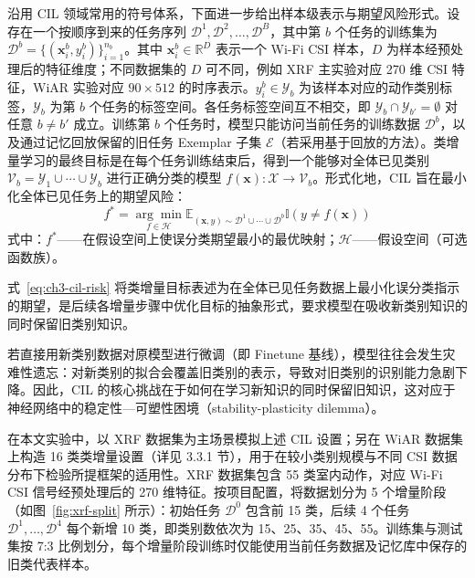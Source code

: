 沿用 CIL 领域常用的符号体系\cite{zhou2024cil}，下面进一步给出样本级表示与期望风险形式。设存在一个按顺序到来的任务序列 $\mathcal{D}^1, \mathcal{D}^2, \ldots, \mathcal{D}^B$，其中第 $b$ 个任务的训练集为 $\mathcal{D}^b = \{(\mathbf{x}_i^b, y_i^b)\}_{i=1}^{n_b}$。其中 $\mathbf{x}_i^b \in \mathbb{R}^D$ 表示一个 Wi-Fi CSI 样本，$D$ 为样本经预处理后的特征维度；不同数据集的 $D$ 可不同，例如 XRF 主实验对应 270 维 CSI 特征，WiAR 实验对应 $90 \times 512$ 的时序表示。$y_i^b \in \mathcal{Y}_b$ 为该样本对应的动作类别标签，$\mathcal{Y}_b$ 为第 $b$ 个任务的标签空间。各任务标签空间互不相交，即 $\mathcal{Y}_b \cap \mathcal{Y}_{b'} = \emptyset$ 对任意 $b \neq b'$ 成立。训练第 $b$ 个任务时，模型只能访问当前任务的训练数据 $\mathcal{D}^b$，以及通过记忆回放保留的旧任务 Exemplar 子集 $\mathcal{E}$（若采用基于回放的方法）。类增量学习的最终目标是在每个任务训练结束后，得到一个能够对全体已见类别 $\mathcal{V}_b = \mathcal{Y}_1 \cup \cdots \cup \mathcal{Y}_b$ 进行正确分类的模型 $f(\mathbf{x}) : \mathcal{X} \to \mathcal{V}_b$。形式化地，CIL 旨在最小化全体已见任务上的期望风险\cite{zhou2024cil}：
\begin{equation}\label{eq:ch3-cil-risk}
f^* = \underset{f \in \mathcal{H}}{\arg\min} \mathbb{E}_{(\mathbf{x},y) \sim \mathcal{D}^1 \cup \cdots \cup \mathcal{D}^b} \mathbb{I}(y \neq f(\mathbf{x}))
\end{equation}
\noindent 式中：$f^*$——在假设空间上使误分类期望最小的最优映射；$\mathcal{H}$——假设空间（可选函数族）。

式~\eqref{eq:ch3-cil-risk} 将类增量目标表述为在全体已见任务数据上最小化误分类指示的期望，是后续各增量步骤中优化目标的抽象形式，要求模型在吸收新类别知识的同时保留旧类别知识。

若直接用新类别数据对原模型进行微调（即 Finetune 基线），模型往往会发生灾难性遗忘：对新类别的拟合会覆盖旧类别的表示，导致对旧类别的识别能力急剧下降。因此，CIL 的核心挑战在于如何在学习新知识的同时保留旧知识，这对应于神经网络中的稳定性—可塑性困境（stability-plasticity dilemma）\cite{grossberg1982studies,zhou2024cil}。

在本文实验中，以 XRF 数据集为主场景模拟上述 CIL 设置；另在 WiAR 数据集上构造 16 类类增量设置（详见 3.3.1 节），用于在较小类别规模与不同 CSI 数据分布下检验所提框架的适用性。XRF 数据集包含 55 类室内动作，对应 Wi-Fi CSI 信号经预处理后的 270 维特征。按项目配置，将数据划分为 5 个增量阶段（如图~\ref{fig:xrf-split} 所示）：初始任务 $\mathcal{D}^0$ 包含前 15 类，后续 4 个任务 $\mathcal{D}^1, \ldots, \mathcal{D}^4$ 每个新增 10 类，即类别数依次为 15、25、35、45、55。训练集与测试集按 7:3 比例划分，每个增量阶段训练时仅能使用当前任务数据及记忆库中保存的旧类代表样本。

